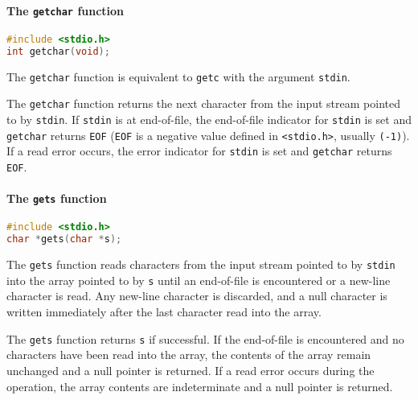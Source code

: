 \paragraph{The \texttt{getchar} function}
\lstset{basicstyle=\scriptsize, numbers=left, captionpos=b, tabsize=4}
\begin{lstlisting}[caption=Section \thesection listing \arabic{filecnt},language={C},
breaklines=true,xleftmargin=15pt,label=lst:section\thesection listing\arabic{filecnt}]
#include <stdio.h>
int getchar(void);
\end{lstlisting}

The \texttt{getchar} function is equivalent to \texttt{getc} with the argument
\texttt{stdin}.

The \texttt{getchar} function returns the next character from the input stream
pointed to by \texttt{stdin}. If \texttt{stdin} is at end-of-file, the
end-of-file indicator for \texttt{stdin} is set and \texttt{getchar} returns
\texttt{EOF} (\texttt{EOF} is a negative value defined in
\texttt{\textless{}stdio.h\textgreater{}}, usually \texttt{(-1)}). If a read
error occurs, the error indicator for \texttt{stdin} is set and
\texttt{getchar} returns \texttt{EOF}.

\paragraph{The \texttt{gets} function}
\lstset{basicstyle=\scriptsize, numbers=left, captionpos=b, tabsize=4}
\begin{lstlisting}[caption=Section \thesection listing \arabic{filecnt},language={C},
breaklines=true,xleftmargin=15pt,label=lst:section\thesection listing\arabic{filecnt}]
#include <stdio.h>
char *gets(char *s);
\end{lstlisting}

The \texttt{gets} function reads characters from the input stream pointed to by
\texttt{stdin} into the array pointed to by \texttt{s} until an end-of-file is
encountered or a new-line character is read. Any new-line character is
discarded, and a null character is written immediately after the last character
read into the array.

The \texttt{gets} function returns \texttt{s} if successful. If the end-of-file
is encountered and no characters have been read into the array, the contents of
the array remain unchanged and a null pointer is returned. If a read error
occurs during the operation, the array contents are indeterminate and a null
pointer is returned.

